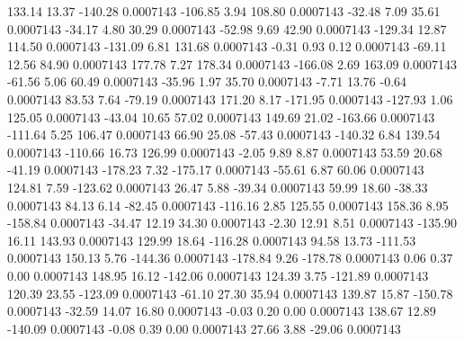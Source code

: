       133.14       13.37     -140.28     0.0007143
     -106.85        3.94      108.80     0.0007143
      -32.48        7.09       35.61     0.0007143
      -34.17        4.80       30.29     0.0007143
      -52.98        9.69       42.90     0.0007143
     -129.34       12.87      114.50     0.0007143
     -131.09        6.81      131.68     0.0007143
       -0.31        0.93        0.12     0.0007143
      -69.11       12.56       84.90     0.0007143
      177.78        7.27      178.34     0.0007143
     -166.08        2.69      163.09     0.0007143
      -61.56        5.06       60.49     0.0007143
      -35.96        1.97       35.70     0.0007143
       -7.71       13.76       -0.64     0.0007143
       83.53        7.64      -79.19     0.0007143
      171.20        8.17     -171.95     0.0007143
     -127.93        1.06      125.05     0.0007143
      -43.04       10.65       57.02     0.0007143
      149.69       21.02     -163.66     0.0007143
     -111.64        5.25      106.47     0.0007143
       66.90       25.08      -57.43     0.0007143
     -140.32        6.84      139.54     0.0007143
     -110.66       16.73      126.99     0.0007143
       -2.05        9.89        8.87     0.0007143
       53.59       20.68      -41.19     0.0007143
     -178.23        7.32     -175.17     0.0007143
      -55.61        6.87       60.06     0.0007143
      124.81        7.59     -123.62     0.0007143
       26.47        5.88      -39.34     0.0007143
       59.99       18.60      -38.33     0.0007143
       84.13        6.14      -82.45     0.0007143
     -116.16        2.85      125.55     0.0007143
      158.36        8.95     -158.84     0.0007143
      -34.47       12.19       34.30     0.0007143
       -2.30       12.91        8.51     0.0007143
     -135.90       16.11      143.93     0.0007143
      129.99       18.64     -116.28     0.0007143
       94.58       13.73     -111.53     0.0007143
      150.13        5.76     -144.36     0.0007143
     -178.84        9.26     -178.78     0.0007143
        0.06        0.37        0.00     0.0007143
      148.95       16.12     -142.06     0.0007143
      124.39        3.75     -121.89     0.0007143
      120.39       23.55     -123.09     0.0007143
      -61.10       27.30       35.94     0.0007143
      139.87       15.87     -150.78     0.0007143
      -32.59       14.07       16.80     0.0007143
       -0.03        0.20        0.00     0.0007143
      138.67       12.89     -140.09     0.0007143
       -0.08        0.39        0.00     0.0007143
       27.66        3.88      -29.06     0.0007143
